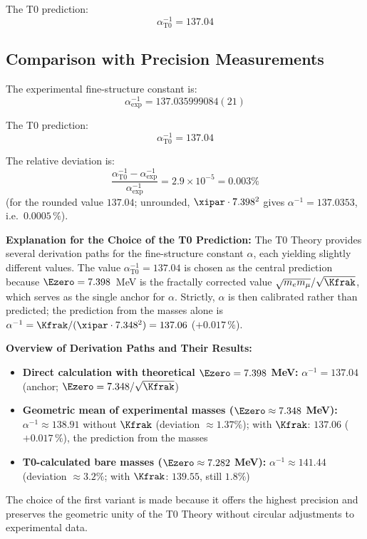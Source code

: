 	The T0 prediction:
	\begin{equation}
		\alpha_{\text{T0}}^{-1} = 137.04
	\end{equation}
	\subsection{Comparison with Precision Measurements}
	
	The experimental fine-structure constant is:
	\begin{equation}
		\alpha_{\text{exp}}^{-1} = 137.035999084(21)
	\end{equation}
	
	The T0 prediction:
	\begin{equation}
		\alpha_{\text{T0}}^{-1} = 137.04
		\label{eq:alpha_t0}
	\end{equation}
	
	The relative deviation is:
	\begin{equation}
		\frac{\alpha_{\text{T0}}^{-1} - \alpha_{\text{exp}}^{-1}}{\alpha_{\text{exp}}^{-1}} = 2.9 \times 10^{-5} = 0.003\%
	\end{equation}
	(for the rounded value $137.04$; unrounded, $\xipar \cdot 7.398^2$ gives $\alpha^{-1} = 137.0353$, i.e.\ $0.0005\,\%$).
	
	\textbf{Explanation for the Choice of the T0 Prediction:} The T0 Theory provides several derivation paths for the fine-structure constant $\alpha$, each yielding slightly different values. The value $\alpha_{\text{T0}}^{-1} = 137.04$ is chosen as the central prediction because $\Ezero = 7.398$~MeV is the fractally corrected value $\sqrt{m_e m_\mu}/\sqrt{\Kfrak}$, which serves as the single anchor for $\alpha$. Strictly, $\alpha$ is then calibrated rather than predicted; the prediction from the masses alone is $\alpha^{-1} = \Kfrak/(\xipar \cdot 7.348^2) = 137.06$ ($+0.017\,\%$).
	
	\begin{foundation}
		\textbf{Overview of Derivation Paths and Their Results:}
		\begin{itemize}
			\item \textbf{Direct calculation with theoretical $\Ezero = 7.398$ MeV:} $\alpha^{-1} = 137.04$ (anchor; $\Ezero = 7.348/\sqrt{\Kfrak}$)
			\item \textbf{Geometric mean of experimental masses ($\Ezero \approx 7.348$ MeV):} $\alpha^{-1} \approx 138.91$ without $\Kfrak$ (deviation $\approx 1.37\%$); with $\Kfrak$: $137.06$ ($+0.017\,\%$), the prediction from the masses
			\item \textbf{T0-calculated bare masses ($\Ezero \approx 7.282$ MeV):} $\alpha^{-1} \approx 141.44$ (deviation $\approx 3.2\%$; with $\Kfrak$: $139.55$, still $1.8\%$)
		\end{itemize}
		
		The choice of the first variant is made because it offers the highest precision and preserves the geometric unity of the T0 Theory without circular adjustments to experimental data.
	\end{foundation}	

